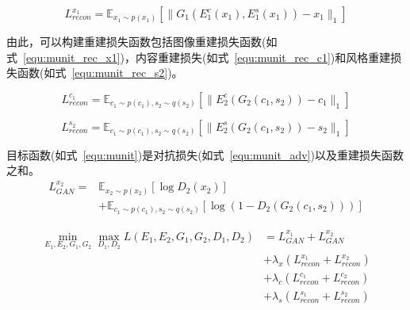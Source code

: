 \begin{equation}
\label{equ:munit_rec_x1}
L_{recon}^{x_1} = \mathbb{E}_{x_1 \sim p(x_1)}[\parallel G_1(E_1^c(x_1),E_1^s(x_1))-x_1\parallel_1]
\end{equation}


由此，可以构建重建损失函数包括图像重建损失函数(如式~\ref{equ:munit_rec_x1})，内容重建损失(如式~\ref{equ:munit_rec_c1})和风格重建损失函数(如式~\ref{equ:munit_rec_s2})。

\begin{equation}
\label{equ:munit_rec_c1}
L_{recon}^{c_1} = \mathbb{E}_{c_1 \sim p(c_1), s_2 \sim q(s_2)}[\parallel E_2^c(G_2(c_1,s_2))-c_1\parallel_1]
\end{equation}



\begin{equation}
\label{equ:munit_rec_s2}
L_{recon}^{s_2} = \mathbb{E}_{c_1 \sim p(c_1), s_2 \sim q(s_2)}[\parallel E_2^s(G_2(c_1,s_2))-s_2\parallel_1]
\end{equation}

目标函数(如式~\ref{equ:munit})是对抗损失(如式~\ref{equ:munit_adv})以及重建损失函数之和。
\begin{equation}
\label{equ:munit_adv}
\begin{aligned}
L_{GAN}^{x_2} = & \mathbb{E}_{x_2 \sim p(x_2)}[\log D_2(x_2)] \\
& +\mathbb{E}_{c_1 \sim p(c_1), s_2 \sim q(s_2)}[\log(1-D_2(G_2(c_1,s_2)))]
\end{aligned}
\end{equation}

\begin{equation}
\label{equ:munit}
\begin{aligned}
\min \limits_{E_1,E_2,G_1,G_2} \max \limits_{D_1,D_2} L(E_1,E_2,G_1,G_2,D_1,D_2) & = L_{GAN}^{x_1}+L_{GAN}^{x_2} \\
& +\lambda_x(L_{recon}^{x_1}+L_{recon}^{x_2}) \\
& + \lambda_c(L_{recon}^{c_1}+L_{recon}^{c_2}) \\
& +\lambda_s(L_{recon}^{s_1}+L_{recon}^{s_2})
\end{aligned}
\end{equation}


